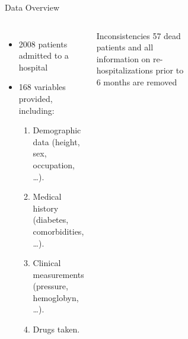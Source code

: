 \documentclass[aspectratio=169,xcolor=dvipsnames]{beamer}
\begin{document}
\begin{frame}{Data Overview}
    \begin{columns}[c]
        \begin{itemize}
            \item 2008 patients admitted to a hospital
            \item 168 variables provided, including:
            \begin{enumerate}
                \item Demographic data (height, sex, occupation, \ldots).
                \item Medical history (diabetes, comorbidities, \ldots).
                \item Clinical measurements (pressure, hemoglobyn, \ldots).
                \item Drugs taken.
            \end{enumerate}
        \end{itemize}
        \begin{alertblock}{Inconsistencies}
            57 dead patients and all information on re-hospitalizations prior to 6 months are removed
        \end{alertblock}

        \begin{figure}
        \end{figure}

        \begin{figure}
        \end{figure}


\end{columns}
\end{frame}
\end{document}
